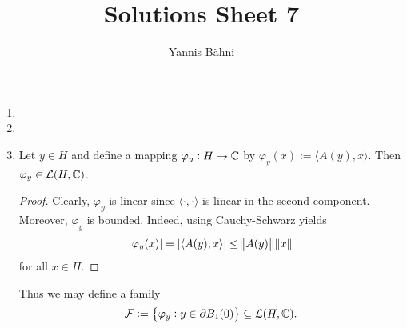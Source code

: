 

\title{Solutions Sheet 7}
\author{Yannis B\"{a}hni}
\address[Yannis B\"{a}hni]{University of Zurich, R\"{a}mistrasse 71, 8006 Zurich}



\maketitle
\thispagestyle{fancy}

\setcounter{section}{1}

\begin{enumerate}[label = \textbf{Exercise \arabic*.},wide = 0pt, itemsep = 1.5ex]
	\item
	\item
	\item 
		\begin{lemma}
			Let $y \in H$ and define a mapping $\varphi_y : H \to \mathbb{C}$ by $\varphi_y(x) := \langle A(y),x \rangle$. Then $\varphi_y \in \mathcal{L}(H,\mathbb{C})$.
			\label{lem:family}
		\end{lemma}

		\begin{proof}
			Clearly, $\varphi_y$ is linear since $\langle \cdot,\cdot \rangle$ is linear in the second component. Moreover, $\varphi_y$ is bounded. Indeed, using Cauchy-Schwarz yields
			\begin{equation*}
				\abs[0]{\varphi_y(x)} = \abs[0]{\langle A(y), x \rangle} \leq \norm{A(y)} \norm{x}
			\end{equation*}
			\noindent for all $x \in H$.
		\end{proof}

		Thus we may define a family
		\begin{equation*}
			\Fcal := \cbr{\varphi_y : y \in \partial B_1(0)} \subseteq \Lcal(H,\Cbb).
		\end{equation*}


\end{enumerate}
